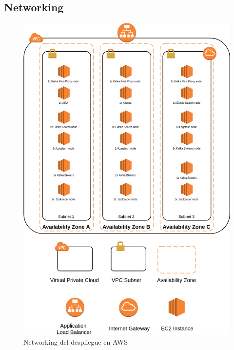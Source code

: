 \subsection{Networking}\label{cap:networking}

\begin{figure}[!htb]
	\includegraphics[width=\linewidth] {Moduloss-netdeploy.png}
	\caption{Networking del despliegue en AWS}
	\label{fig:networking1}
\end{figure}


